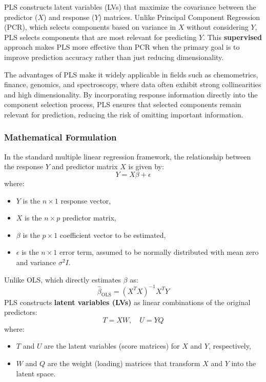 \documentclass[11pt,twoside,a4paper]{article}
\begin{document}
PLS constructs latent variables (LVs) that maximize the covariance between the predictor (\(X\)) and response (\(Y\)) matrices. Unlike Principal Component Regression (PCR), which selects components based on variance in \( X \) without considering \( Y \), PLS selects components that are most relevant for predicting \( Y \). This \textbf{supervised} approach makes PLS more effective than PCR when the primary goal is to improve prediction accuracy rather than just reducing dimensionality.

The advantages of PLS make it widely applicable in fields such as chemometrics, finance, genomics, and spectroscopy, where data often exhibit strong collinearities and high dimensionality. By incorporating response information directly into the component selection process, PLS ensures that selected components remain relevant for prediction, reducing the risk of omitting important information.

\subsubsection{Mathematical Formulation}
In the standard multiple linear regression framework, the relationship between the response \( Y \) and predictor matrix \( X \) is given by:
\begin{equation}
Y = X \beta + \epsilon
\end{equation}
where:
\begin{itemize}
    \item \( Y \) is the \( n \times 1 \) response vector,
    \item \( X \) is the \( n \times p \) predictor matrix,
    \item \( \beta \) is the \( p \times 1 \) coefficient vector to be estimated,
    \item \( \epsilon \) is the \( n \times 1 \) error term, assumed to be normally distributed with mean zero and variance \( \sigma^2 I \).
\end{itemize}

Unlike OLS, which directly estimates \( \beta \) as:
\begin{equation}
\hat{\beta}_{\text{OLS}} = (X^T X)^{-1} X^T Y
\end{equation}
PLS constructs \textbf{latent variables (LVs)} as linear combinations of the original predictors:
\begin{equation}
T = XW, \quad U = YQ
\end{equation}
where:
\begin{itemize}
    \item \( T \) and \( U \) are the latent variables (score matrices) for \( X \) and \( Y \), respectively,
    \item \( W \) and \( Q \) are the weight (loading) matrices that transform \( X \) and \( Y \) into the latent space.
\end{itemize}
\end{document}

